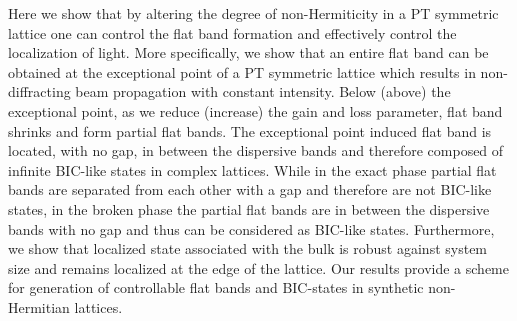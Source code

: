 \documentclass[aps,prl,twocolumn,showpacs,groupedaddress,amsmath,amssymb]{revtex4}
\begin{document}
Here we show that by altering the degree of non-Hermiticity in a PT symmetric lattice one can control the flat band formation and effectively control the localization of light. More specifically, we show that an entire flat band can be obtained at the exceptional point of a PT symmetric lattice which results in non-diffracting beam propagation with constant intensity. Below (above) the exceptional point, as we reduce (increase) the gain and loss parameter, flat band shrinks and form partial flat bands. The exceptional point induced flat band is located, with no gap, in between the dispersive bands and therefore composed of infinite BIC-like states in complex lattices. While in the exact phase partial flat bands are separated from each other with a gap and therefore are not BIC-like states, in the broken phase the partial flat bands are in between the dispersive bands with no gap and thus can be considered as BIC-like states. Furthermore, we show that localized state associated with the bulk is robust against system size and remains localized at the edge of the lattice. Our results provide a scheme for generation of controllable flat bands and BIC-states in synthetic non-Hermitian lattices.
\end{document}
